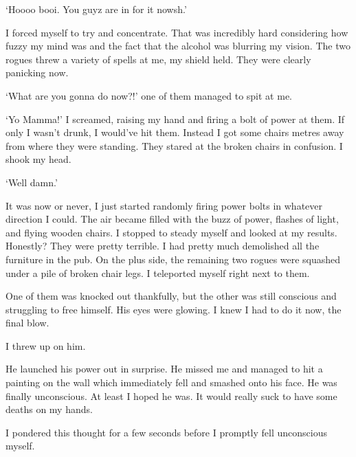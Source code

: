 `Hoooo booi. You guyz are in for it nowsh.'

I forced myself to try and concentrate. That was incredibly hard considering how fuzzy my mind was and the fact that the alcohol was blurring my vision. The two rogues threw a variety of spells at me, my shield held. They were clearly panicking now.

`What are you gonna do now?!' one of them managed to spit at me.

`Yo Mamma!' I screamed, raising my hand and firing a bolt of power at them. If only I wasn't drunk, I would've hit them. Instead I got some chairs metres away from where they were standing. They stared at the broken chairs in confusion. I shook my head.

`Well damn.'

It was now or never, I just started randomly firing power bolts in whatever direction I could. The air became filled with the buzz of power, flashes of light, and flying wooden chairs. I stopped to steady myself and looked at my results. Honestly? They were pretty terrible. I had pretty much demolished all the furniture in the pub. On the plus side, the remaining two rogues were squashed under a pile of broken chair legs. I teleported myself right next to them.

One of them was knocked out thankfully, but the other was still conscious and struggling to free himself. His eyes were glowing. I knew I had to do it now, the final blow.

I threw up on him.

He launched his power out in surprise. He missed me and managed to hit a painting on the wall which immediately fell and smashed onto his face. He was finally unconscious. At least I hoped he was. It would really suck to have some deaths on my hands. 

I pondered this thought for a few seconds before I promptly fell unconscious myself.  
